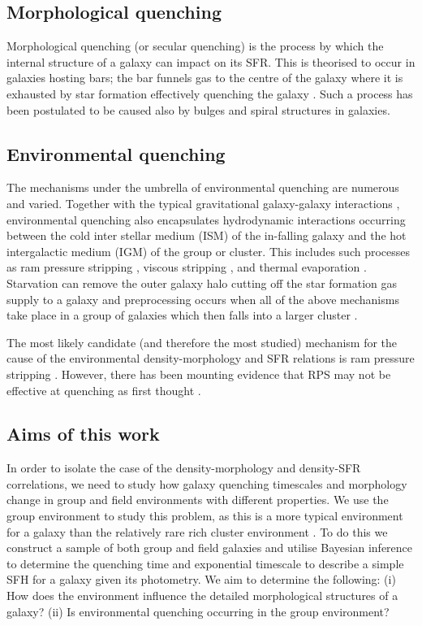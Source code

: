 \documentclass[useAMS,usenatbib]{mn2e}
\begin{document}
\subsection{Morphological quenching}
Morphological quenching (or secular quenching) is the process by which the internal structure of a galaxy can impact on its SFR. This is theorised to occur in galaxies hosting bars; the bar funnels gas to the centre of the galaxy \citep{athanassoula92a} where it is exhausted by star formation effectively quenching the galaxy \citep{sheth05, zurita04, masters10c}. Such a process has been postulated to be caused also by bulges \citep{bluck14} and spiral \citep{hart16} structures in galaxies. 
  
\subsection{Environmental quenching}
The mechanisms under the umbrella of environmental quenching are  numerous and varied. Together with the typical gravitational galaxy-galaxy interactions \citep{moore96}, environmental quenching also encapsulates hydrodynamic interactions occurring between the cold inter stellar medium (ISM) of the in-falling galaxy and the hot intergalactic medium (IGM) of the group or cluster. This includes such processes as ram pressure stripping \citep{gunngott72}, viscous stripping \citep{nulsen82}, and thermal evaporation \citep[a rapid rise in temperature of the ISM due to contact with the IGM;][]{cowie77}. Starvation \citep{larson80} can remove the outer galaxy halo cutting off the star formation gas supply to a galaxy and preprocessing occurs when all of the above mechanisms take place in a group of galaxies which then falls into a larger cluster \citep{dressler04}. 

The most likely candidate (and therefore the most studied) mechanism for the cause of the environmental density-morphology and SFR relations is ram pressure stripping \citep[RPS;][]{abadi99, poggianti99}. However, there has been mounting evidence that RPS may not be effective at quenching as first thought \citep{emerick16, fillingham16}. 

\subsection{Aims of this work} 
In order to isolate the case of the density-morphology and density-SFR correlations, we need to study how galaxy quenching timescales and morphology change in group and field environments with different properties. We use the group environment to study this problem, as this is a more typical environment for a galaxy than the relatively rare rich cluster environment \citep{carlberg04}. To do this we construct a sample of both group and field galaxies and utilise Bayesian inference to determine the quenching time and exponential timescale to describe a simple SFH for a galaxy given its photometry. We aim to determine the following: (i) How does the environment influence the detailed morphological structures of a galaxy?  (ii) Is environmental quenching occurring in the group environment?
\end{document}
